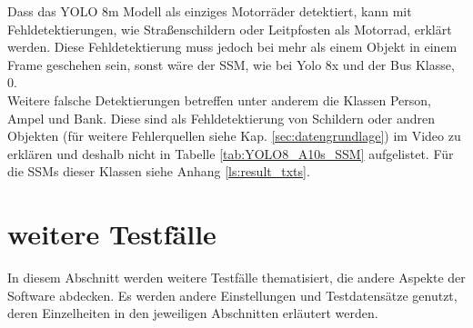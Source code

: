 {\begin{table}[ht]
\begin{tabular}{l|l|l|l|l|l|l}
			\end{tabular}
		\end{table}
		Dass das YOLO 8m Modell als einziges Motorräder detektiert, kann mit Fehldetektierungen, wie Straßenschildern oder Leitpfosten als Motorrad, erklärt werden. Diese Fehldetektierung muss jedoch bei mehr als einem Objekt in einem Frame geschehen sein, sonst wäre der SSM, wie bei Yolo 8x und der Bus Klasse, 0. \\
		Weitere falsche Detektierungen betreffen unter anderem die Klassen Person, Ampel und Bank. Diese sind als Fehldetektierung von Schildern oder andren Objekten (für weitere Fehlerquellen siehe Kap. \ref{sec:datengrundlage}) im Video zu erklären und deshalb nicht in Tabelle \ref{tab:YOLO8_A10s_SSM} aufgelistet. Für die SSMs dieser Klassen siehe Anhang \ref{ls:result_txts}.
	}

\section{weitere Testfälle}
{
	In diesem Abschnitt werden weitere Testfälle thematisiert, die andere Aspekte der Software abdecken. Es werden andere Einstellungen und Testdatensätze genutzt, deren Einzelheiten in den jeweiligen Abschnitten erläutert werden.

}
